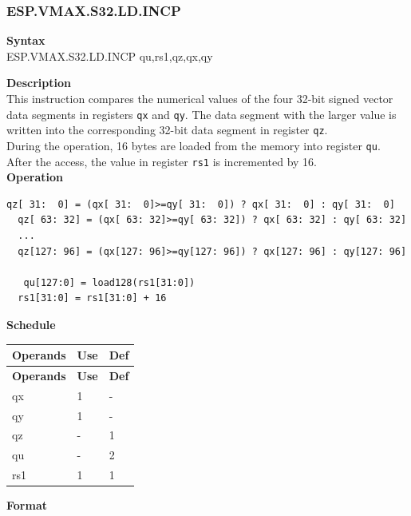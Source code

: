 \newpage
\subsubsection{ESP.VMAX.S32.LD.INCP}\label{instruction:ESPVMAXS32LDINCP}
\textbf{Syntax}\\
ESP.VMAX.S32.LD.INCP qu,rs1,qz,qx,qy

\textbf{Description}\\
This instruction compares the numerical values of the four 32-bit signed vector data segments in registers \lstinline{qx} and \lstinline{qy}. The data segment with the larger value is written into the corresponding 32-bit data segment in register \lstinline{qz}.\\During the operation, 16 bytes are loaded from the memory into register \lstinline{qu}. After the access, the value in register \lstinline{rs1} is incremented by 16.\\
\textbf{Operation}
\begin{lstlisting}[escapeinside=`?]
  qz[ 31:  0] = (qx[ 31:  0]>=qy[ 31:  0]) ? qx[ 31:  0] : qy[ 31:  0]
  qz[ 63: 32] = (qx[ 63: 32]>=qy[ 63: 32]) ? qx[ 63: 32] : qy[ 63: 32]
  ...
  qz[127: 96] = (qx[127: 96]>=qy[127: 96]) ? qx[127: 96] : qy[127: 96]

   qu[127:0] = load128(rs1[31:0])
  rs1[31:0] = rs1[31:0] + 16
\end{lstlisting}


\textbf{Schedule}\\
\begin{longtable}[c]{|l|l|l|}
    \hline
    \rowcolor{lightgray}
    \textbf{Operands} & \textbf{Use} & \textbf{Def} \\\hline
    \endfirsthead
    \hline
    \rowcolor{lightgray}
     \textbf{Operands} & \textbf{Use} & \textbf{Def} \\\hline
    \endhead
    \hline
    \endfoot

    qx & 1 & - \\\hline
  qy & 1 & - \\\hline
     qz & - & 1 \\\hline
     qu & - & 2 \\\hline
     rs1 & 1 & 1

\end{longtable}

\textbf{Format}\\

